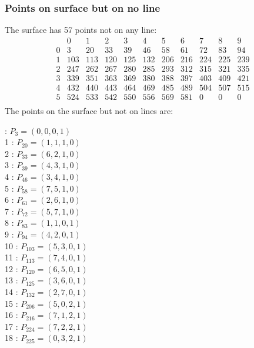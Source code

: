 \documentclass{article}
\begin{document}
{\subsubsection*{Points on surface but on no line}
The surface has 57 points not on any line:\\
$$
\begin{array}{r|*{10}{r}}
 & 0 & 1 & 2 & 3 & 4 & 5 & 6 & 7 & 8 & 9\\
\hline
0 & 3 & 20 & 33 & 39 & 46 & 58 & 61 & 72 & 83 & 94\\
1 & 103 & 113 & 120 & 125 & 132 & 206 & 216 & 224 & 225 & 239\\
2 & 247 & 262 & 267 & 280 & 285 & 293 & 312 & 315 & 321 & 335\\
3 & 339 & 351 & 363 & 369 & 380 & 388 & 397 & 403 & 409 & 421\\
4 & 432 & 440 & 443 & 464 & 469 & 485 & 489 & 504 & 507 & 515\\
5 & 524 & 533 & 542 & 550 & 556 & 569 & 581 & 0 & 0 & 0\\
\end{array}
$$
The points on the surface but not on lines are:\\
\begin{multicols}{2}
 : $P_{3}=( 0, 0, 0, 1 )$\\
1 : $P_{20}=( 1, 1, 1, 0 )$\\
2 : $P_{33}=( 6, 2, 1, 0 )$\\
3 : $P_{39}=( 4, 3, 1, 0 )$\\
4 : $P_{46}=( 3, 4, 1, 0 )$\\
5 : $P_{58}=( 7, 5, 1, 0 )$\\
6 : $P_{61}=( 2, 6, 1, 0 )$\\
7 : $P_{72}=( 5, 7, 1, 0 )$\\
8 : $P_{83}=( 1, 1, 0, 1 )$\\
9 : $P_{94}=( 4, 2, 0, 1 )$\\
10 : $P_{103}=( 5, 3, 0, 1 )$\\
11 : $P_{113}=( 7, 4, 0, 1 )$\\
12 : $P_{120}=( 6, 5, 0, 1 )$\\
13 : $P_{125}=( 3, 6, 0, 1 )$\\
14 : $P_{132}=( 2, 7, 0, 1 )$\\
15 : $P_{206}=( 5, 0, 2, 1 )$\\
16 : $P_{216}=( 7, 1, 2, 1 )$\\
17 : $P_{224}=( 7, 2, 2, 1 )$\\
18 : $P_{225}=( 0, 3, 2, 1 )$\\

\end{multicols}}
\end{document}
